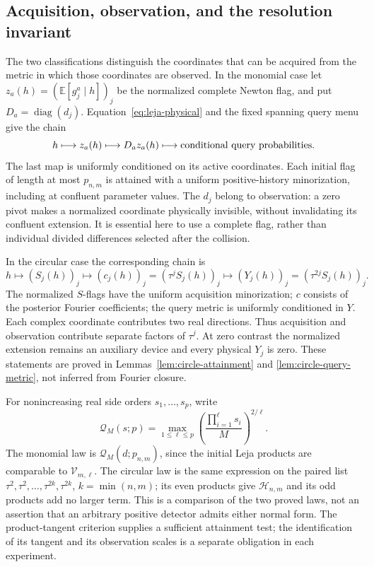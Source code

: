 \documentclass[11pt]{amsart}
\theoremstyle{definition}\newtheorem{definition}[theorem]{Definition}
\theoremstyle{remark}\newtheorem{remark}[theorem]{Remark}
\newcommand{\E}{\mathbb E}\newcommand{\Prob}{\mathbb P}
\begin{document}
\subsection{Acquisition, observation, and the resolution invariant}
\label{sec:acquisition-observation-comparison}
The two classifications distinguish the coordinates that can be acquired
from the metric in which those coordinates are observed. In the monomial
case let $z_a(h)=(\E[g_j^a\mid h])_j$ be the normalized complete Newton
flag, and put $D_a=\operatorname{diag}(d_j)$. Equation~\eqref{eq:leja-physical}
and the fixed spanning query menu give the chain
\[
 h\longmapsto z_a(h)\longmapsto D_a z_a(h)
       \longmapsto\hbox{conditional query probabilities}.
\]
The last map is uniformly conditioned on its active coordinates. Each
initial flag of length at most $p_{n,m}$ is attained with a uniform
positive-history minorization, including at confluent parameter values.
The $d_j$ belong to observation: a zero pivot makes a normalized
coordinate physically invisible, without invalidating its confluent
extension. It is essential here to use a complete flag, rather than
individual divided differences selected after the collision.

In the circular case the corresponding chain is
\[
 h\longmapsto(S_j(h))_j
   \longmapsto(c_j(h))_j=(\tau^jS_j(h))_j
   \longmapsto(Y_j(h))_j=(\tau^{2j}S_j(h))_j.
\]
The normalized $S$-flags have the uniform acquisition minorization;
$c$ consists of the posterior Fourier coefficients; the query metric is
uniformly conditioned in $Y$. Each complex coordinate contributes two
real directions. Thus acquisition and observation contribute separate
factors of $\tau^j$. At zero contrast the normalized extension remains
an auxiliary device and every physical $Y_j$ is zero. These statements
are proved in Lemmas~\ref{lem:circle-attainment} and
\ref{lem:circle-query-metric}, not inferred from Fourier closure.

For nonincreasing real side orders $s_1,\ldots,s_p$, write
\[
 \mathcal Q_M(s;p)=\max_{1\le\ell\le p}
       \left(\frac{\prod_{i=1}^{\ell}s_i}{M}\right)^{2/\ell}.
\]
The monomial law is $\mathcal Q_M(d;p_{n,m})$, since the initial
Leja products are comparable to $\mathcal V_{m,\ell}$. The circular
law is the same expression on the paired list
$\tau^2,\tau^2,\ldots,\tau^{2k},\tau^{2k}$, $k=\min(n,m)$;
its even products give $\mathcal H_{n,m}$ and its odd products add
no larger term. This is a comparison of the two proved laws, not an
assertion that an arbitrary positive detector admits either normal form.
The product-tangent criterion supplies a sufficient attainment test;
the identification of its tangent and its observation scales is a
separate obligation in each experiment.
\end{document}
